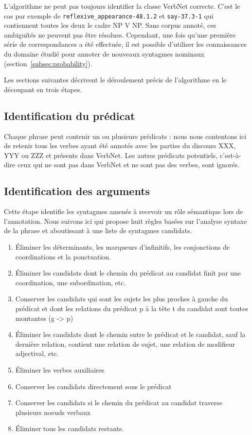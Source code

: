 L'algorithme ne peut pas toujours identifier la classe VerbNet correcte. C'est
le cas par exemple de \texttt{reflexive\_appearance-48.1.2} et
\texttt{say-37.3-1} qui contiennent toutes les deux le cadre NP V NP. Sans
corpus annoté, ces ambiguïtés ne peuvent pas être résolues.  Cependant, une
fois qu'une première série de correspondances a été effectuée, il est possible
d'utiliser les connaissances du domaine étudié pour annoter de nouveaux
syntagmes nominaux (section~\ref{subsec:probability}).

Les sections suivantes décrivent le déroulement précis de l'algorithme en le
découpant en trois étapes.

\subsection{Identification du prédicat}

Chaque phrase peut contenir un ou plusieurs prédicats : nous nous contentons
ici de retenir tous les verbes ayant été annotés avec les parties du discours
XXX, YYY ou ZZZ et présents dans VerbNet. Les autres prédicats potentiels,
c'est-à-dire ceux qui ne sont pas dans VerbNet et ne sont pas des verbes, sont
ignorés.

\subsection{Identification des arguments}

Cette étape identifie les syntagmes amenés à recevoir un rôle sémantique lors
de l'annotation. Nous suivons ici \cite{lang2011unsupervised} qui propose huit
règles basées sur l'analyse syntaxe de la phrase et aboutissant à une liste de
syntagmes candidats.

\begin{enumerate}
    \item Éliminer les déterminants, les marqueurs d'infinitifs, les conjonctions de coordinations et la ponctuation.
    \item Éliminer les candidats dont le chemin du prédicat au candidat finit par une coordination, une subordination, etc.
    \item Conserver les candidats qui sont les sujets les plus proches à gauche du prédicat et dont les relations du prédicat p à la tête t du candidat sont toutes montantes (g -> p)
    \item Éliminer les candidats  dont le chemin entre le prédicat et le candidat, sauf la dernière relation, contient une relation de sujet, une relation de modifieur adjectival, etc.
    \item Éliminer les verbes auxiliaires
    \item Conserver les candidats directement sous le prédicat
    \item Conserver les candidats si le chemin du prédicat au candidat traverse plusieurs noeuds verbaux
    \item Éliminer tous les candidats restants.
\end{enumerate}

